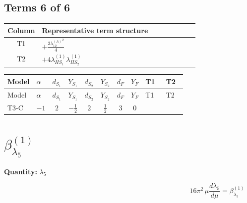 \documentclass[8pt]{article}
\begin{document}
\begin{landscape}
\subsection*{Terms 6 of 6}
\begin{center}
\begin{tabular}{@{}c >{\raggedright\arraybackslash}p{0.82\linewidth}@{}}
\toprule
Column & Representative term structure \\
\midrule
T1 & \(\displaystyle +\frac{3 {\lambda_{12}^{(A)}}^2}{4}\) \\
\midrule
T2 & \(\displaystyle +4 {\lambda_{HS_1}^{(1)}} {\lambda_{HS_2}^{(1)}}\) \\
\midrule
\bottomrule
\end{tabular}
\end{center}
\smallskip
\tiny
\begin{longtable}{@{}llcccccc >{\raggedright\arraybackslash}p{0.21\linewidth} >{\raggedright\arraybackslash}p{0.21\linewidth}@{}}
\toprule
Model & $\alpha$ & $d_{S_1}$ & $Y_{S_1}$ & $d_{S_2}$ & $Y_{S_2}$ & $d_F$ & $Y_F$ & T1 & T2 \\
\midrule
\endfirsthead
\toprule
Model & $\alpha$ & $d_{S_1}$ & $Y_{S_1}$ & $d_{S_2}$ & $Y_{S_2}$ & $d_F$ & $Y_F$ & T1 & T2 \\
\midrule
\endhead
T3-C & $-1$ & $2$ & $-\frac{1}{2}$ & $2$ & $\frac{1}{2}$ & $3$ & $0$ & \scriptsize\adjustbox{max width=\linewidth}{$\begin{gathered} +\frac{3 {\lambda_{12}^{(A)}}^2}{4}\end{gathered}$} & \scriptsize\adjustbox{max width=\linewidth}{$\begin{gathered} +4 {\lambda_{HS_1}^{(1)}} {\lambda_{HS_2}^{(1)}}\end{gathered}$} \\
\midrule
\bottomrule
\end{longtable}
\clearpage
\section*{$\beta_{\lambda_5}^{(1)}$}
\noindent\textbf{Quantity: }$\lambda_5$\par\smallskip
\[16\pi^2\,\mu\frac{d \lambda_5}{d\mu}=\beta_{\lambda_5}^{(1)}\]

\end{landscape}
\end{document}
